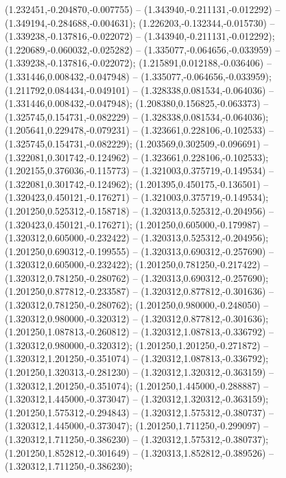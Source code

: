  (1.232451,-0.204870,-0.007755) -- (1.343940,-0.211131,-0.012292) -- (1.349194,-0.284688,-0.004631);
 (1.226203,-0.132344,-0.015730) -- (1.339238,-0.137816,-0.022072) -- (1.343940,-0.211131,-0.012292);
 (1.220689,-0.060032,-0.025282) -- (1.335077,-0.064656,-0.033959) -- (1.339238,-0.137816,-0.022072);
 (1.215891,0.012188,-0.036406) -- (1.331446,0.008432,-0.047948) -- (1.335077,-0.064656,-0.033959);
 (1.211792,0.084434,-0.049101) -- (1.328338,0.081534,-0.064036) -- (1.331446,0.008432,-0.047948);
 (1.208380,0.156825,-0.063373) -- (1.325745,0.154731,-0.082229) -- (1.328338,0.081534,-0.064036);
 (1.205641,0.229478,-0.079231) -- (1.323661,0.228106,-0.102533) -- (1.325745,0.154731,-0.082229);
 (1.203569,0.302509,-0.096691) -- (1.322081,0.301742,-0.124962) -- (1.323661,0.228106,-0.102533);
 (1.202155,0.376036,-0.115773) -- (1.321003,0.375719,-0.149534) -- (1.322081,0.301742,-0.124962);
 (1.201395,0.450175,-0.136501) -- (1.320423,0.450121,-0.176271) -- (1.321003,0.375719,-0.149534);
 (1.201250,0.525312,-0.158718) -- (1.320313,0.525312,-0.204956) -- (1.320423,0.450121,-0.176271);
 (1.201250,0.605000,-0.179987) -- (1.320312,0.605000,-0.232422) -- (1.320313,0.525312,-0.204956);
 (1.201250,0.690312,-0.199555) -- (1.320313,0.690312,-0.257690) -- (1.320312,0.605000,-0.232422);
 (1.201250,0.781250,-0.217422) -- (1.320312,0.781250,-0.280762) -- (1.320313,0.690312,-0.257690);
 (1.201250,0.877812,-0.233587) -- (1.320312,0.877812,-0.301636) -- (1.320312,0.781250,-0.280762);
 (1.201250,0.980000,-0.248050) -- (1.320312,0.980000,-0.320312) -- (1.320312,0.877812,-0.301636);
 (1.201250,1.087813,-0.260812) -- (1.320312,1.087813,-0.336792) -- (1.320312,0.980000,-0.320312);
 (1.201250,1.201250,-0.271872) -- (1.320312,1.201250,-0.351074) -- (1.320312,1.087813,-0.336792);
 (1.201250,1.320313,-0.281230) -- (1.320312,1.320312,-0.363159) -- (1.320312,1.201250,-0.351074);
 (1.201250,1.445000,-0.288887) -- (1.320312,1.445000,-0.373047) -- (1.320312,1.320312,-0.363159);
 (1.201250,1.575312,-0.294843) -- (1.320312,1.575312,-0.380737) -- (1.320312,1.445000,-0.373047);
 (1.201250,1.711250,-0.299097) -- (1.320312,1.711250,-0.386230) -- (1.320312,1.575312,-0.380737);
 (1.201250,1.852812,-0.301649) -- (1.320313,1.852812,-0.389526) -- (1.320312,1.711250,-0.386230);
